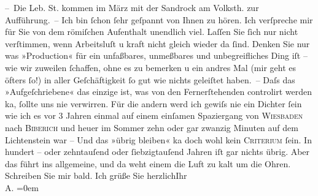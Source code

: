 \begin{ledgroupsized}[t]{13cm}
           \pstart
           – Die Leb. St. kommen im März mit
                    der Sandrock am Volksth. zur Aufführung. –\pend
           \pstart
           Ich bin ſchon ſehr geſpannt von Ihnen zu hören. Ich verſpreche mir für Sie von
                    dem römiſchen Aufenthalt unendlich viel. Laſſen
                    Sie ſich nur nicht verſtimmen, wenn {\pb}Arbeitsluſt u
                    kraft nicht gleich wieder da ſind. Denken Sie nur was »Production« für ein
                    unfaßbares, unmeßbares und unbegreifliches Ding iſt – wie wir zuweilen ſchaffen,
                    ohne es zu bemerken u ein andres Mal (mir geht es öfters ſo!) in aller
                    Geſchäftigkeit ſo gut wie nichts geleiſtet haben. – Daſs das »Aufgeſchriebene«
                    das einzige ist, was von den Fernerſtehenden controlirt werden ka{\geminationn}, ſollte uns nie verwirren. Für die {\pb}andern werd ich gewiſs nie ein Dichter ſein wie ich
                    es vor 3 Jahren einmal auf einem einſamen Spaziergang von \textsc{Wiesbaden} nach \textsc{Biberich} und heuer im Sommer zehn oder gar zwanzig Minuten auf dem Lichtenstein war – Und das »übrig bleiben« ka{\geminationn} doch wohl kein \textsc{Criterium}{ }ſein. In hundert – oder zehntauſend oder
                    ſiebzigtauſend Jahren iſt gar nichts {\pb}übrig.\pend
           \pstart
           Aber das führt ins allgemeine, und da weht einem die Luft zu kalt um die
                    Ohren.\pend
           \pstart
           Schreiben Sie mir bald. Ich grüße Sie herzlich\hspace*{1.5em}Ihr{\\[\baselineskip]}\spacefill\mbox{A.}\pend
           \leftskip=0em{}\endnumbering{}\end{ledgroupsized}  \newcommand{\dateiname}{L01238}\newcommand{\titel}{Arthur Schnitzler an Hugo von Hofmannsthal, 7. 10. 1902}\newcommand{\editorInnen}{ Martin Anton Müller und Gerd-Hermann Susen}
      